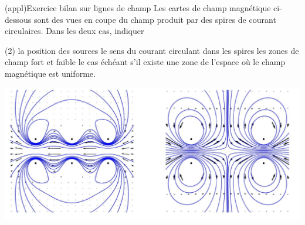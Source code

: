 \documentclass[../../main/main.tex]{subfiles}
\begin{document}
\begin{tcb*}[breakable](appl){Exercice bilan sur lignes de champ}
	Les cartes de champ magnétique ci-dessous sont des vues en coupe du champ
	produit par des spires de courant circulaires. Dans les deux cas, indiquer
	\begin{tasks}[label=\protect\fbox{\arabic*}](2)
		\task la position des sources
		\task le sens du courant circulant dans les spires
		\task les zones de champ fort et faible
		\task le cas échéant s'il existe une zone de l'espace où le champ magnétique
		est uniforme.
	\end{tasks}
	\begin{center}
		\includegraphics[scale=.8]{ldc_bilan.jpg}
	\end{center}
\end{tcb*}

\vspace*{-10pt}
\end{document}
